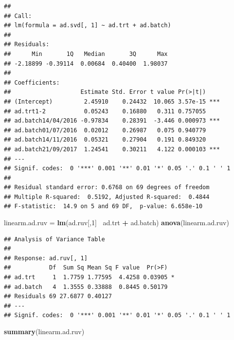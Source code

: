 \documentclass[]{book}
\newenvironment{Shaded}{\begin{snugshade}}{\end{snugshade}}
\newcommand{\KeywordTok}[1]{\textcolor[rgb]{0.13,0.29,0.53}{\textbf{#1}}}
\newcommand{\DecValTok}[1]{\textcolor[rgb]{0.00,0.00,0.81}{#1}}
\newcommand{\StringTok}[1]{\textcolor[rgb]{0.31,0.60,0.02}{#1}}
\newcommand{\OperatorTok}[1]{\textcolor[rgb]{0.81,0.36,0.00}{\textbf{#1}}}
\newcommand{\NormalTok}[1]{#1}
\begin{document}
\begin{verbatim}
## 
## Call:
## lm(formula = ad.svd[, 1] ~ ad.trt + ad.batch)
## 
## Residuals:
##      Min       1Q   Median       3Q      Max 
## -2.18899 -0.39114  0.00684  0.40400  1.98037 
## 
## Coefficients:
##                    Estimate Std. Error t value Pr(>|t|)    
## (Intercept)         2.45910    0.24432  10.065 3.57e-15 ***
## ad.trt1-2           0.05243    0.16880   0.311 0.757055    
## ad.batch14/04/2016 -0.97834    0.28391  -3.446 0.000973 ***
## ad.batch01/07/2016  0.02012    0.26987   0.075 0.940779    
## ad.batch14/11/2016  0.05321    0.27904   0.191 0.849320    
## ad.batch21/09/2017  1.24541    0.30211   4.122 0.000103 ***
## ---
## Signif. codes:  0 '***' 0.001 '**' 0.01 '*' 0.05 '.' 0.1 ' ' 1
## 
## Residual standard error: 0.6768 on 69 degrees of freedom
## Multiple R-squared:  0.5192, Adjusted R-squared:  0.4844 
## F-statistic:  14.9 on 5 and 69 DF,  p-value: 6.658e-10
\end{verbatim}

\begin{Shaded}
\begin{Highlighting}[]
\NormalTok{linearm.ad.ruv =}\StringTok{ }\KeywordTok{lm}\NormalTok{(ad.ruv[,}\DecValTok{1}\NormalTok{]}\OperatorTok{~}\StringTok{ }\NormalTok{ad.trt }\OperatorTok{+}\StringTok{ }\NormalTok{ad.batch)}
\KeywordTok{anova}\NormalTok{(linearm.ad.ruv)}
\end{Highlighting}
\end{Shaded}

\begin{verbatim}
## Analysis of Variance Table
## 
## Response: ad.ruv[, 1]
##           Df  Sum Sq Mean Sq F value  Pr(>F)  
## ad.trt     1  1.7759 1.77595  4.4258 0.03905 *
## ad.batch   4  1.3555 0.33888  0.8445 0.50179  
## Residuals 69 27.6877 0.40127                  
## ---
## Signif. codes:  0 '***' 0.001 '**' 0.01 '*' 0.05 '.' 0.1 ' ' 1
\end{verbatim}

\begin{Shaded}
\begin{Highlighting}[]
\KeywordTok{summary}\NormalTok{(linearm.ad.ruv)}
\end{Highlighting}
\end{Shaded}
\end{document}
